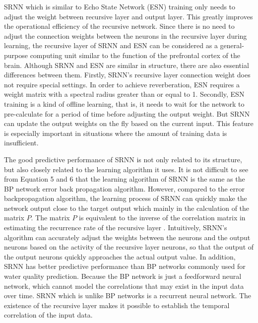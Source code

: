 \documentclass[runningheads]{llncs}
\begin{document}
SRNN which is similar to Echo State Network (ESN) training only needs 
to adjust the weight between recursive layer and output layer. 
This greatly improves the operational efficiency of the recursive network. 
Since there is no need to adjust the connection weights between the neurons 
in the recursive layer during learning, the recursive layer of SRNN 
and ESN can be considered as a general-purpose computing unit similar
 to the function of the prefrontal cortex of the brain\cite{RN20,RN21}. 
 Although SRNN and ESN are similar in structure, there are also essential 
 differences between them. Firstly, SRNN's recursive layer connection 
 weight does not require special settings. In order to achieve 
 reverberation, ESN requires a weight matrix with a spectral radius 
 greater than or equal to 1. Secondly, ESN training is a kind of 
 offline learning, that is, it needs to wait for the network to 
 pre-calculate for a period of time before adjusting the output 
 weight. But SRNN can update the output weights on the fly based 
 on the current input. This feature is especially important 
 in situations where the amount of training data is insufficient. 

 The good predictive performance of SRNN is not only related to 
 its structure, but also closely related to the learning algorithm 
 it uses. It is not difficult to see from Equation 5 and 6 that the 
 learning algorithm of SRNN is the same as the BP network error 
 back propagation algorithm. However, compared to the error 
 backpropagation algorithm, the learning process of SRNN can 
 quickly make the network output close to the target output 
 which mainly in the calculation of the matrix $P$. The matrix $P$ 
 is equivalent to the inverse of the correlation matrix in 
 estimating the recurrence rate of the recursive layer \cite{RN23}. 
 Intuitively, SRNN's algorithm can accurately adjust the weights 
 between the neurons and the output neurons based on the activity 
 of the recursive layer neurons, so that the output of the 
 output neurons quickly approaches the actual output value. 
 In addition, SRNN has better predictive performance than BP 
 networks commonly used for water quality prediction. Because 
 the BP network is just a feedforward neural network, which 
 cannot model the correlations that may exist in the input data 
 over time. SRNN which is unlike BP networks is a recurrent neural 
 network. The existence of the recursive layer makes it possible 
 to establish the temporal correlation of the input data. 
\end{document}
